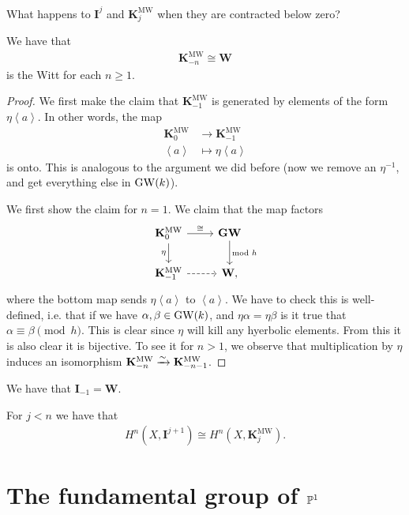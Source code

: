 \documentclass[11pt,openany]{book}
\providecommand{\KMW}{\mathbf{K}^\mathrm{MW}}
\begin{document}
What happens to $\mathbf{I}^j$ and $\KMW_j$ when they are contracted below zero?

\begin{proposition} We have that
\begin{align*}
    \KMW_{-n} \cong \mathbf{W}
\end{align*}
is the Witt for each $n \ge 1$.
\end{proposition}
\begin{proof} We first make the claim that $\KMW_{-1}$ is generated by elements of the form $\eta \left\langle a \right\rangle$. In other words, the map
\begin{align*}
    \KMW_0 &\to \KMW_{-1} \\
    \left\langle a \right\rangle &\mapsto \eta \left\langle a \right\rangle
\end{align*}
is onto. This is analogous to the argument we did before (now we remove an $\eta^{-1}$, and get everything else in $\GW(k)$).


We first show the claim for $n=1$. We claim that the map factors
\[ \begin{tikzcd}
    \KMW_0\rar["\cong"]\dar["\eta" left] & \mathbf{GW}\dar["\text{mod }h" right]\\
    \KMW_{-1}\rar[dashed] & \mathbf{W},
\end{tikzcd} \]
where the bottom map sends $\eta \left\langle a \right\rangle$ to $\left\langle a \right\rangle$.
We have to check this is well-defined, i.e. that if we have $\alpha,\beta\in \GW(k)$, and $\eta \alpha = \eta\beta$ is it true that $\alpha \equiv \beta \pmod{h}$. This is clear since $\eta$ will kill any hyerbolic elements. From this it is also clear it is bijective. To see it for $n > 1$, we observe that multiplication by $\eta$ induces an isomorphism $\KMW_{-n}\xto{\sim} \KMW_{-n-1}$.
\end{proof}

\begin{corollary} We have that $\mathbf{I}_{-1} = \mathbf{W}$.
\end{corollary}


\begin{corollary} For $j<n$ we have that
\begin{align*}
    H^n(X, \mathbf{I}^{j+1}) \cong H^n(X, \KMW_j).
\end{align*}
\end{corollary}



\section{The fundamental group of \texorpdfstring{$\P^1$}{P\^{}1}}
\end{document}
